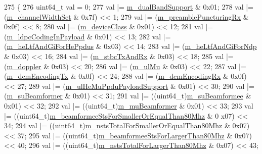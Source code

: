 \begin{DoxyCode}
275 \{
276   uint64\_t val = 0;
277   val |= \hyperlink{classns3_1_1HeCapabilities_a04f73bb72b43ddef5fb488852125bdb2}{m\_dualBandSupport} & 0x01;
278   val |= (\hyperlink{classns3_1_1HeCapabilities_aa797e3d4f18880c949ef9d3a85077edf}{m\_channelWidthSet} & 0x7f) << 1;
279   val |= (\hyperlink{classns3_1_1HeCapabilities_ad180538f4dd3e4c2b1e8aadf36a0075c}{m\_preamblePuncturingRx} & 0x0f) << 8;
280   val |= (\hyperlink{classns3_1_1HeCapabilities_aac04f89c46b6cf874ea55f9c8217d778}{m\_deviceClass} & 0x01) << 12;
281   val |= (\hyperlink{classns3_1_1HeCapabilities_a536bed2c74547655822291fe6201ee8c}{m\_ldpcCodingInPayload} & 0x01) << 13;
282   val |= (\hyperlink{classns3_1_1HeCapabilities_ac0d27f9b4d2a8c9de09e5d5382998ddd}{m\_heLtfAndGiForHePpdus} & 0x03) << 14;
283   val |= (\hyperlink{classns3_1_1HeCapabilities_abf0323f232fa7a83f7450fc025d73162}{m\_heLtfAndGiForNdp} & 0x03) << 16;
284   val |= (\hyperlink{classns3_1_1HeCapabilities_a8aab94e87c6737a9c43b8d08dfdcd93b}{m\_stbcTxAndRx} & 0x03) << 18;
285   val |= (\hyperlink{classns3_1_1HeCapabilities_abcc2b218c56f4d0b84cd4ea433cde69f}{m\_doppler} & 0x03) << 20;
286   val |= (\hyperlink{classns3_1_1HeCapabilities_a5e00ff194cfcfb5ea4f7f7262db519a9}{m\_ulMu} & 0x03) << 22;
287   val |= (\hyperlink{classns3_1_1HeCapabilities_a7f0d8ca47744f7f0b5ca6eeda52c66e9}{m\_dcmEncodingTx} & 0x0f) << 24;
288   val |= (\hyperlink{classns3_1_1HeCapabilities_afe1da2309e85423e9d7b8ca27ca045c2}{m\_dcmEncodingRx} & 0x0f) << 27;
289   val |= (\hyperlink{classns3_1_1HeCapabilities_a71f3feb98d53dfeca95de2bf08e41443}{m\_ulHeMuPpduPayloadSupport} & 0x01) << 30;
290   val |= (\hyperlink{classns3_1_1HeCapabilities_a8a4e2966d7d67a038a7b08f7d733819c}{m\_suBeamformer} & 0x01) << 31;
291   val |= ((uint64\_t)\hyperlink{classns3_1_1HeCapabilities_a68f6c78532eaaec71445fa9d1bb86f1b}{m\_suBeamformee} & 0x01) << 32;
292   val |= ((uint64\_t)\hyperlink{classns3_1_1HeCapabilities_ab372f215235e3d509eeaf07301687a08}{m\_muBeamformer} & 0x01) << 33;
293   val |= ((uint64\_t)\hyperlink{classns3_1_1HeCapabilities_aa58d62ca4576da470b5d0b3eb31e4bd9}{m\_beamformeeStsForSmallerOrEqualThan80Mhz} & 0
      x07) << 34;
294   val |= ((uint64\_t)\hyperlink{classns3_1_1HeCapabilities_a005028af78a23140224a61769c938681}{m\_nstsTotalForSmallerOrEqualThan80Mhz} & 0x07) << 
      37;
295   val |= ((uint64\_t)\hyperlink{classns3_1_1HeCapabilities_a14af7669973c17c133210eb5c6e05e74}{m\_beamformeeStsForLargerThan80Mhz} & 0x07) << 40;
296   val |= ((uint64\_t)\hyperlink{classns3_1_1HeCapabilities_aca46963765d4cbf624622a602994b52b}{m\_nstsTotalForLargerThan80Mhz} & 0x07) << 43;

\end{DoxyCode}
